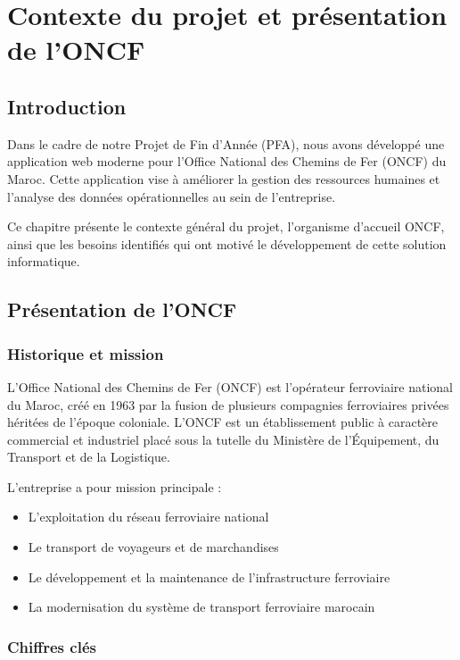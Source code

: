 \chapter{Contexte du projet et présentation de l'ONCF}

\section{Introduction}

Dans le cadre de notre Projet de Fin d'Année (PFA), nous avons développé une application web moderne pour l'Office National des Chemins de Fer (ONCF) du Maroc. Cette application vise à améliorer la gestion des ressources humaines et l'analyse des données opérationnelles au sein de l'entreprise.

Ce chapitre présente le contexte général du projet, l'organisme d'accueil ONCF, ainsi que les besoins identifiés qui ont motivé le développement de cette solution informatique.

\section{Présentation de l'ONCF}

\subsection{Historique et mission}

L'Office National des Chemins de Fer (ONCF) est l'opérateur ferroviaire national du Maroc, créé en 1963 par la fusion de plusieurs compagnies ferroviaires privées héritées de l'époque coloniale. L'ONCF est un établissement public à caractère commercial et industriel placé sous la tutelle du Ministère de l'Équipement, du Transport et de la Logistique.

L'entreprise a pour mission principale :
\begin{itemize}
    \item L'exploitation du réseau ferroviaire national
    \item Le transport de voyageurs et de marchandises
    \item Le développement et la maintenance de l'infrastructure ferroviaire
    \item La modernisation du système de transport ferroviaire marocain
\end{itemize}

\subsection{Chiffres clés}

